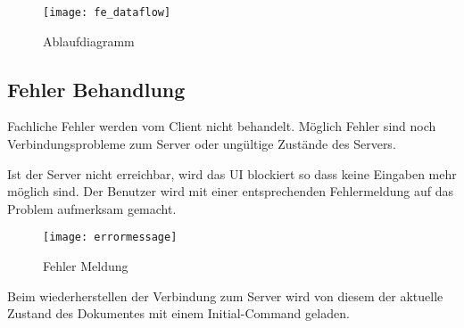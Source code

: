 \begin{figure}[H]
    \texttt{[image: fe\_dataflow]}
    \caption{Ablaufdiagramm}
\end{figure}

\subsection{Fehler Behandlung}
Fachliche Fehler werden vom Client nicht behandelt.
Möglich Fehler sind noch Verbindungsprobleme zum Server oder ungültige Zustände des Servers.

Ist der Server nicht erreichbar, wird das UI blockiert so dass keine Eingaben mehr möglich sind.
Der Benutzer wird mit einer entsprechenden Fehlermeldung auf das Problem aufmerksam gemacht.

\begin{figure}[H]
    \centering
    \texttt{[image: errormessage]}
    \caption{Fehler Meldung}
\end{figure}

Beim wiederherstellen der Verbindung zum Server wird von diesem der aktuelle Zustand des Dokumentes mit einem Initial-Command geladen.